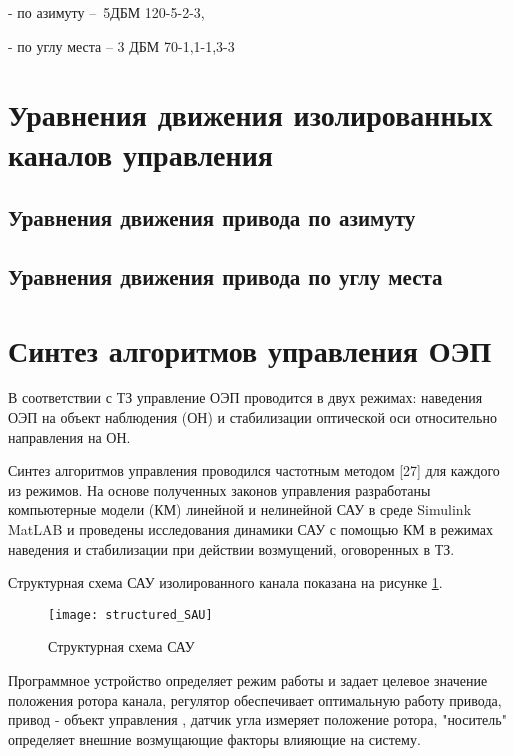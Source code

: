 - по азимуту –\  5ДБМ 120-5-2-3, \par

- по углу места – 3 ДБМ 70-1,1-1,3-3\par









\section{Уравнения движения изолированных каналов управления} \label{ch:ch4/sect3}


\subsection{Уравнения движения привода по азимуту} \label{subsec:ch4/sect3/sub1}


\subsection{Уравнения движения привода по углу места} \label{subsec:ch4/sect3/sub2}

\section{Синтез алгоритмов управления ОЭП} \label{ch:ch4/sect4-}

В соответствии с ТЗ управление ОЭП проводится в двух режимах:
наведения ОЭП на объект наблюдения (ОН) и стабилизации оптической оси относительно направления на ОН. 

Синтез алгоритмов управления проводился частотным методом [27] для каждого из режимов. На основе полученных законов управления разработаны компьютерные модели (КМ) линейной и нелинейной САУ в среде Simulink MatLAB и проведены исследования динамики САУ с помощью КМ в режимах наведения и стабилизации при действии возмущений, оговоренных в ТЗ.

Структурная схема САУ изолированного канала показана на рисунке \ref{fig:structured_SAU}.

\begin{figure}[ht]
	\centering
	\texttt{[image: structured\_SAU]}
	\caption{Структурная схема САУ}
	\label{fig:structured_SAU}
\end{figure}

Программное устройство определяет режим работы и задает целевое значение положения ротора канала, регулятор обеспечивает оптимальную работу привода, привод - объект управления , 
датчик угла измеряет положение ротора, "носитель" определяет внешние возмущающие факторы влияющие на систему.


